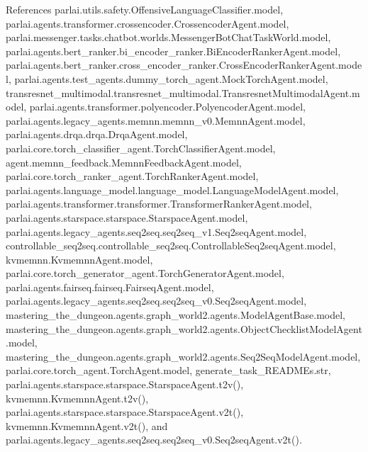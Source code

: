 References parlai.\+utils.\+safety.\+Offensive\+Language\+Classifier.\+model, parlai.\+agents.\+transformer.\+crossencoder.\+Crossencoder\+Agent.\+model, parlai.\+messenger.\+tasks.\+chatbot.\+worlds.\+Messenger\+Bot\+Chat\+Task\+World.\+model, parlai.\+agents.\+bert\+\_\+ranker.\+bi\+\_\+encoder\+\_\+ranker.\+Bi\+Encoder\+Ranker\+Agent.\+model, parlai.\+agents.\+bert\+\_\+ranker.\+cross\+\_\+encoder\+\_\+ranker.\+Cross\+Encoder\+Ranker\+Agent.\+model, parlai.\+agents.\+test\+\_\+agents.\+dummy\+\_\+torch\+\_\+agent.\+Mock\+Torch\+Agent.\+model, transresnet\+\_\+multimodal.\+transresnet\+\_\+multimodal.\+Transresnet\+Multimodal\+Agent.\+model, parlai.\+agents.\+transformer.\+polyencoder.\+Polyencoder\+Agent.\+model, parlai.\+agents.\+legacy\+\_\+agents.\+memnn.\+memnn\+\_\+v0.\+Memnn\+Agent.\+model, parlai.\+agents.\+drqa.\+drqa.\+Drqa\+Agent.\+model, parlai.\+core.\+torch\+\_\+classifier\+\_\+agent.\+Torch\+Classifier\+Agent.\+model, agent.\+memnn\+\_\+feedback.\+Memnn\+Feedback\+Agent.\+model, parlai.\+core.\+torch\+\_\+ranker\+\_\+agent.\+Torch\+Ranker\+Agent.\+model, parlai.\+agents.\+language\+\_\+model.\+language\+\_\+model.\+Language\+Model\+Agent.\+model, parlai.\+agents.\+transformer.\+transformer.\+Transformer\+Ranker\+Agent.\+model, parlai.\+agents.\+starspace.\+starspace.\+Starspace\+Agent.\+model, parlai.\+agents.\+legacy\+\_\+agents.\+seq2seq.\+seq2seq\+\_\+v1.\+Seq2seq\+Agent.\+model, controllable\+\_\+seq2seq.\+controllable\+\_\+seq2seq.\+Controllable\+Seq2seq\+Agent.\+model, kvmemnn.\+Kvmemnn\+Agent.\+model, parlai.\+core.\+torch\+\_\+generator\+\_\+agent.\+Torch\+Generator\+Agent.\+model, parlai.\+agents.\+fairseq.\+fairseq.\+Fairseq\+Agent.\+model, parlai.\+agents.\+legacy\+\_\+agents.\+seq2seq.\+seq2seq\+\_\+v0.\+Seq2seq\+Agent.\+model, mastering\+\_\+the\+\_\+dungeon.\+agents.\+graph\+\_\+world2.\+agents.\+Model\+Agent\+Base.\+model, mastering\+\_\+the\+\_\+dungeon.\+agents.\+graph\+\_\+world2.\+agents.\+Object\+Checklist\+Model\+Agent.\+model, mastering\+\_\+the\+\_\+dungeon.\+agents.\+graph\+\_\+world2.\+agents.\+Seq2\+Seq\+Model\+Agent.\+model, parlai.\+core.\+torch\+\_\+agent.\+Torch\+Agent.\+model, generate\+\_\+task\+\_\+\+R\+E\+A\+D\+M\+Es.\+str, parlai.\+agents.\+starspace.\+starspace.\+Starspace\+Agent.\+t2v(), kvmemnn.\+Kvmemnn\+Agent.\+t2v(), parlai.\+agents.\+starspace.\+starspace.\+Starspace\+Agent.\+v2t(), kvmemnn.\+Kvmemnn\+Agent.\+v2t(), and parlai.\+agents.\+legacy\+\_\+agents.\+seq2seq.\+seq2seq\+\_\+v0.\+Seq2seq\+Agent.\+v2t().

